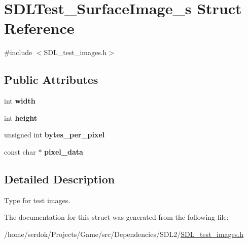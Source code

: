 \hypertarget{structSDLTest__SurfaceImage__s}{}\section{S\+D\+L\+Test\+\_\+\+Surface\+Image\+\_\+s Struct Reference}
\label{structSDLTest__SurfaceImage__s}


{\ttfamily \#include $<$S\+D\+L\+\_\+test\+\_\+images.\+h$>$}

\subsection*{Public Attributes}
\begin{DoxyCompactItemize}
\item 
\mbox{\label{structSDLTest__SurfaceImage__s_a3cbacf6b015a22832ab4d3f509719609}} 
int {\bfseries width}
\item 
\mbox{\label{structSDLTest__SurfaceImage__s_a310092874695556e4b7f1f63aec24213}} 
int {\bfseries height}
\item 
\mbox{\label{structSDLTest__SurfaceImage__s_a2daf91bab3d79fb9dfa25e8ade43e606}} 
unsigned int {\bfseries bytes\+\_\+per\+\_\+pixel}
\item 
\mbox{\label{structSDLTest__SurfaceImage__s_acf2d3006bea5690f564d3003d1512fa7}} 
const char $\ast$ {\bfseries pixel\+\_\+data}
\end{DoxyCompactItemize}


\subsection{Detailed Description}
Type for test images. 

The documentation for this struct was generated from the following file\+:\begin{DoxyCompactItemize}
\item 
/home/serdok/\+Projects/\+Game/src/\+Dependencies/\+S\+D\+L2/\hyperlink{SDL__test__images_8h}{S\+D\+L\+\_\+test\+\_\+images.\+h}\end{DoxyCompactItemize}
